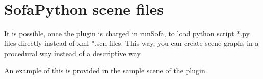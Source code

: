 \
\section{SofaPython scene files}

It is possible, once the plugin is charged in runSofa, to load python script *.py files directly instead of xml *.scn files. This way, you can create scene graphs in a procedural way instead of a descriptive way.

An example of this is provided in the  sample scene of the plugin. 
   
